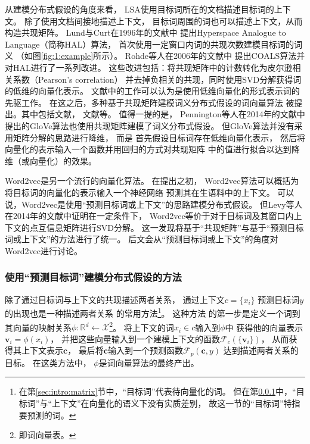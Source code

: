 从建模分布式假设的角度来看，
LSA使用目标词所在的文档描述目标词的上下文。
除了使用文档间接地描述上下文，
目标词周围的词也可以描述上下文，从而构造共现矩阵。
Lund与Curt在1996年的文献中
提出Hyperspace Analogue to Language（简称HAL）算法，
首次使用一定窗口内词的共现次数建模目标词的词义
（如图\ref{fig:1:example}所示）。
Rohde等人在2006年的文献中
提出COALS算法并对HAL进行了一系列改进。
这些改进包括：将共现矩阵中的计数转化为皮尔逊相关系数（Pearson's correlation）
并去掉负相关的共现，同时使用SVD分解获得词的低维的向量化表示。
文献中的工作可以认为是使用低维向量化的形式表示词的先驱工作。
在这之后，多种基于共现矩阵建模词义分布式假设的词向量算法
被提出。其中包括文献，
文献等。
值得一提的是，
Pennington等人在2014年的文献中
提出的GloVe算法也使用共现矩阵建模了词义分布式假设。
但GloVe算法并没有采用矩阵分解的思路进行降维，
而是
首先假设目标词存在低维向量化表示，
然后将向量化的表示输入一个函数并用回归的方式对共现矩阵
中的值进行拟合以达到降维（或向量化）的效果。

Word2vec\cite{DBLP:journals/corr/MikolovSCCD13}是另一个流行的向量化算法。
在提出之初，
Word2vec算法可以概括为将目标词的向量化的表示输入一个神经网络
预测其在生语料中的上下文。
可以说，Word2vec是使用``预测目标词或上下文''的思路建模分布式假设。
但Levy等人在2014年的文献中证明在一定条件下，
Word2vec等价于对于目标词及其窗口内上下文的点互信息矩阵进行SVD分解。
这一发现将基于``共现矩阵''与基于``预测目标词或上下文''的方法进行了统一。
后文会从``预测目标词或上下文''的角度对Word2vec进行讨论。

\subsubsection{使用``预测目标词''建模分布式假设的方法}\label{sec:intro:predict}
除了通过目标词与上下文的共现描述两者关系，
通过上下文$c = \{x_i\}$
预测目标词$y$
的出现也是一种描述两者关系
的常用方法\footnote{
	在第\ref{sec:intro:matrix}节中，``目标词''代表待向量化的词。
	但在第\ref{sec:intro:predict}中，``目标词''与``上下文''在向量化的语义下没有实质差别，
	故这一节的``目标词''特指要预测的词。}。
这种方法
的第一步是定义一个词到其向量的映射关系$\phi: \mathbb{R}^{d} \leftarrow \mathcal{X}$\footnote{即词向量表。}。
将上下文的词$x_i \in c$输入到$\phi$中
获得他的向量表示$\mathbf{v}_i = \phi(x_i)$，
并把这些向量输入到一个建模上下文的函数$\mathcal{F}_{c} (\{\mathbf{v}_i\})$，
从而获得其上下文表示$\mathbf{c}$，
最后将$\mathbf{c}$输入到一个预测函数$\mathcal{F}_{p} (\mathbf{c}, y)$
达到描述两者关系的目标。
在这类方法中，
$\phi$是词向量算法的最终产出。

